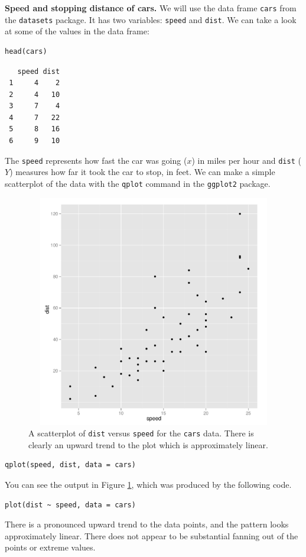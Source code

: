 \documentclass[captions=tableheading]{scrbook}
\begin{document}
\begin{example}
\label{exa:Speed-and-Stopping}
\textbf{Speed and stopping distance of cars.} We will use the data frame \texttt{cars} from the \texttt{datasets} package. It has two variables: \texttt{speed} and \texttt{dist}. We can take a look at some of the values in the data frame: 

\begin{verbatim}
head(cars)
\end{verbatim}

\begin{verbatim}
   speed dist
 1     4    2
 2     4   10
 3     7    4
 4     7   22
 5     8   16
 6     9   10
\end{verbatim}

The \texttt{speed} represents how fast the car was going (\(x\)) in miles per hour and \texttt{dist} (\(Y\)) measures how far it took the car to stop, in feet. We can make a simple scatterplot of the data with the \texttt{qplot} command in the \texttt{ggplot2} package. 

\begin{figure}[ht!]
  \includegraphics[width=5in, height=4in]{img/carscatter.pdf}
  \caption[Scatterplot of \texttt{dist} versus \texttt{speed} for the \texttt{cars} data]{\small A scatterplot of \texttt{dist} versus \texttt{speed} for the \texttt{cars} data.  There is clearly an upward trend to the plot which is approximately linear.}
  \label{fig:Scatter-cars}
\end{figure}


\begin{verbatim}
qplot(speed, dist, data = cars)
\end{verbatim}

You can see the output in Figure \ref{fig:Scatter-cars}, which was produced by the following code.


\begin{verbatim}
plot(dist ~ speed, data = cars)
\end{verbatim}

There is a pronounced upward trend to the data points, and the pattern looks approximately linear. There does not appear to be substantial fanning out of the points or extreme values. 
\end{example}
\end{document}
